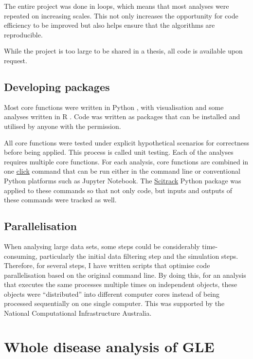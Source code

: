 The entire project was done in loops, which means that most analyses were repeated on increasing scales. This not only increases the opportunity for code efficiency to be improved but also helps ensure that the algorithms are reproducible. 

While the project is too large to be shared in a thesis, all code is available upon request. 

\subsection{Developing packages}
Most core functions were written in Python \citep{van1995python}, with visualisation and some analyses written in R \citep{r}. Code was written as packages that can be installed and utilised by anyone with the permission. 

All core functions were tested under explicit hypothetical scenarios for correctness before being applied. This process is called unit testing. Each of the analyses requires multiple core functions. For each analysis, core functions are combined in one \href{https://click.palletsprojects.com/en/8.0.x/}{click} command that can be run either in the command line or conventional Python platforms such as Jupyter Notebook. The \href{https://github.com/HuttleyLab/scitrack}{Scitrack} Python package was applied to these commands so that not only code, but inputs and outputs of these commands were tracked as well.

\subsection{Parallelisation}
When analysing large data sets, some steps could be considerably time-consuming, particularly the initial data filtering step and the simulation steps. Therefore, for several steps, I have written scripts that optimise code parallelisation based on the original command line. By doing this, for an analysis that executes the same processes multiple times on independent objects, these objects were ``distributed'' into different computer cores instead of being processed sequentially on one single computer. This was supported by the National Computational Infrastructure Australia.


\section{Whole disease analysis of GLE}\label{methods:gle}

